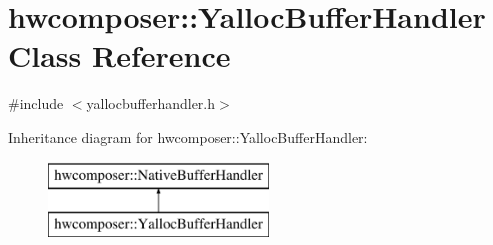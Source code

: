 \hypertarget{classhwcomposer_1_1YallocBufferHandler}{}\section{hwcomposer\+:\+:Yalloc\+Buffer\+Handler Class Reference}
\label{classhwcomposer_1_1YallocBufferHandler}


{\ttfamily \#include $<$yallocbufferhandler.\+h$>$}

Inheritance diagram for hwcomposer\+:\+:Yalloc\+Buffer\+Handler\+:\begin{figure}[H]
\begin{center}
\leavevmode
\includegraphics[height=2.000000cm]{classhwcomposer_1_1YallocBufferHandler}
\end{center}
\end{figure}
